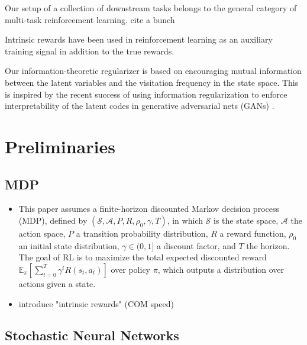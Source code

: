 \documentclass{article} %
\renewcommand{\S}{\mathcal{S}}
\newcommand{\A}{\mathcal{A}}
\newcommand{\EE}{\mathbb{E}}
\begin{document}
Our setup of a collection of downstream tasks belongs to the general category of multi-task reinforcement learning. cite a bunch

Intrinsic rewards have been used in reinforcement learning as an auxiliary training signal in addition to the true rewards.

Our information-theoretic regularizer is based on encouraging mutual information between the latent variables and the visitation frequency in the state space. This is inspired by the recent success of using information regularization to enforce interpretability of the latent codes in generative adversarial nets (GANs) \citep{chen2016infogan}.






\section{Preliminaries}
\subsection{MDP}
\begin{itemize}
    \item This paper assumes a finite-horizon discounted Markov decision process (MDP), defined by $(\S,\A,P, R, \rho_0, \gamma, T)$, in which $\S$ is the state space, $\A$ the action space, $P$ a transition probability distribution, $R$ a reward function, $\rho_0$ an initial state distribution,  $\gamma \in (0, 1]$ a discount factor, and $T$ the horizon. The goal of RL is to maximize the total expected discounted reward $\EE_{\pi} \left[\sum_{t=0}^T \gamma^t R(s_t, a_t) \right]$ over policy $\pi$, which outputs a distribution over actions given a state.
    \item introduce "intrinsic rewards" (COM speed)
\end{itemize}

\subsection{Stochastic Neural Networks}
\end{document}

